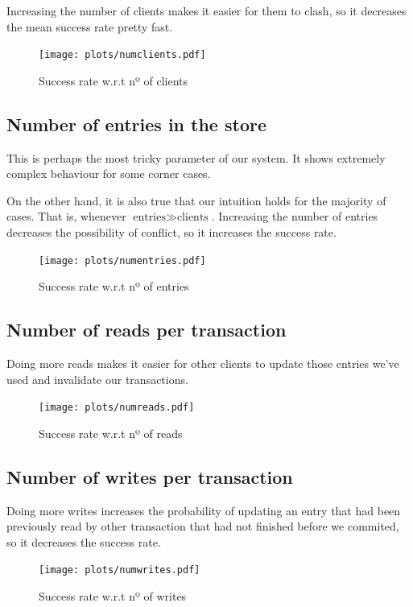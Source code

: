\documentclass[a4paper, 10pt]{article}
\begin{document}
Increasing the number of clients makes it easier for them to clash, so it decreases the mean success rate pretty fast.

\begin{figure}[H]
  \centering
  \texttt{[image: plots/numclients.pdf]}
    \caption{Success rate w.r.t nº of clients}
    \label{fig:numclients}
\end{figure} 



\clearpage
\subsection{Number of entries in the store}
\label{sec:numentries}
This is perhaps the most tricky parameter of our system. It shows extremely complex behaviour for some corner cases.

On the other hand, it is also true that our intuition holds for the majority of cases. That is, whenever $\text{entries} \gg \text{clients}$. Increasing the number of entries decreases the possibility of conflict, so it increases the success rate.
\begin{figure}[H]
  \centering
  \texttt{[image: plots/numentries.pdf]}
    \caption{Success rate w.r.t nº of entries}
    \label{fig:numentries}
\end{figure} 

\clearpage
\subsection{Number of reads per transaction}
\label{sec:numreads}
Doing more reads makes it easier for other clients to update those entries we've used and invalidate our transactions.

\begin{figure}[H]
  \centering
  \texttt{[image: plots/numreads.pdf]}
    \caption{Success rate w.r.t nº of reads}
    \label{fig:numreads}
\end{figure} 

\clearpage
\subsection{Number of writes per transaction}
\label{sec:numwrites}
Doing more writes increases the probability of updating an entry that had been previously read by other transaction that had not finished before we commited, so it decreases the success rate.

\begin{figure}[H]
  \centering
  \texttt{[image: plots/numwrites.pdf]}
    \caption{Success rate w.r.t nº of writes}
    \label{fig:numwrites}
\end{figure} 
\end{document}
